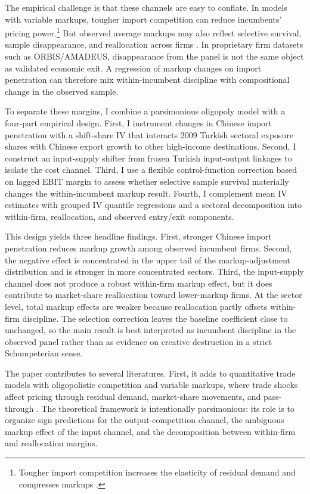 \documentclass[12pt]{article}
\begin{document}
The empirical challenge is that these channels are easy to conflate. In models with variable markups, tougher import competition can reduce incumbents' pricing power.\footnote{Tougher import competition increases the elasticity of residual demand and compresses markups \parencite{melitzMarketSizeTrade2008, edmondCompetitionMarkupsGains2015}.} But observed average markups may also reflect selective survival, sample disappearance, and reallocation across firms \parencite{arkolakisElusiveProCompetitiveEffects2019}. In proprietary firm datasets such as ORBIS/AMADEUS, disappearance from the panel is not the same object as validated economic exit. A regression of markup changes on import penetration can therefore mix within-incumbent discipline with compositional change in the observed sample.

To separate these margins, I combine a parsimonious oligopoly model with a four-part empirical design. First, I instrument changes in Chinese import penetration with a shift-share IV that interacts 2009 Turkish sectoral exposure shares with Chinese export growth to other high-income destinations. Second, I construct an input-supply shifter from frozen Turkish input-output linkages to isolate the cost channel. Third, I use a flexible control-function correction based on lagged EBIT margin to assess whether selective sample survival materially changes the within-incumbent markup result. Fourth, I complement mean IV estimates with grouped IV quantile regressions and a sectoral decomposition into within-firm, reallocation, and observed entry/exit components.

This design yields three headline findings. First, stronger Chinese import penetration reduces markup growth among observed incumbent firms. Second, the negative effect is concentrated in the upper tail of the markup-adjustment distribution and is stronger in more concentrated sectors. Third, the input-supply channel does not produce a robust within-firm markup effect, but it does contribute to market-share reallocation toward lower-markup firms. At the sector level, total markup effects are weaker because reallocation partly offsets within-firm discipline. The selection correction leaves the baseline coefficient close to unchanged, so the main result is best interpreted as incumbent discipline in the observed panel rather than as evidence on creative destruction in a strict Schumpeterian sense.

The paper contributes to several literatures. First, it adds to quantitative trade models with oligopolistic competition and variable markups, where trade shocks affect pricing through residual demand, market-share movements, and pass-through \parencite{deblasUnderstandingMarkupsOpen2015,atkesonPricingtoMarketTradeCosts2008,gaubertGranularComparativeAdvantage2021}. The theoretical framework is intentionally parsimonious: its role is to organize sign predictions for the output-competition channel, the ambiguous markup effect of the input channel, and the decomposition between within-firm and reallocation margins.
\end{document}
